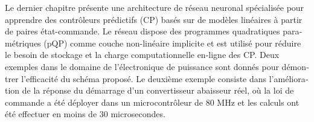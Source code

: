 \begin{otherlanguage}{french}
Le dernier chapitre présente une architecture de réseau neuronal spécialisée pour apprendre des contrôleurs prédictifs (CP) basés sur de modèles linéaires à partir de paires état-commande. Le réseau dispose des programmes quadratiques paramétriques (pQP) comme couche non-linéaire implicite et est utilisé pour réduire le besoin de stockage et la charge computationnelle en-ligne des CP. Deux exemples dans le domaine de l'électronique de puissance sont donnés pour démontrer l'efficacité du schéma proposé. Le deuxième exemple consiste dans l'amélioration de la réponse du démarrage d'un convertisseur abaisseur réel, où la loi de commande a été déployer dans un microcontrôleur de 80 MHz et les calculs ont été effectuer en moins de 30 microsecondes.

\end{otherlanguage}


